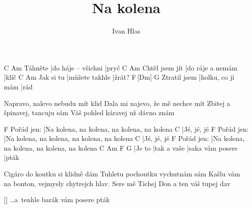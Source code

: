 \documentclass{song}
\title{Na kolena}
\author{Ivan Hlas}
\begin{document}
\strophe
        C                   Am
Táhněte |do háje -- všichni |pryč
               C                Am
Chtěl jsem jít |do ráje a nemám |klíč
          C              Am
Jak si tu |můžete takhle |žrát?
             F\,[Dm]           G
Ztratil jsem |holku, co jí mám |rád
\endstrophe

\strophe*
Napravo, nalevo nebudu mít klid
Dala mi najevo, že mě nechce mít
Zbitej a špinavej, tancuju sám
Váš pohled káravej už dávno znám
\endstrophe

           F
Pořád jen: |Na kolena, na kolena, na kolena, na kolena
C
|Jé, jé, jé
           F
Pořád jen: |Na kolena, na kolena, na kolena, na kolena
C
|Jé, jé, jé
           F
Pořád jen: |Na kolena, na kolena, na kolena, na kolena
C      Am          F                G
|Je to |tak a vaše |saka vám posere |pták
\endstrophe

\strophe*
Cigáro do koutku si klidně dám
Tuhletu pochoutku vychutnám sám
Kašlu vám na bonton, vejmysly chytrejch hlav.
Sere mě Tichej Don a ten váš tupej dav
\endstrophe

\ref{} \ldots a~tenhle barák vám posere pták
\end{document}
